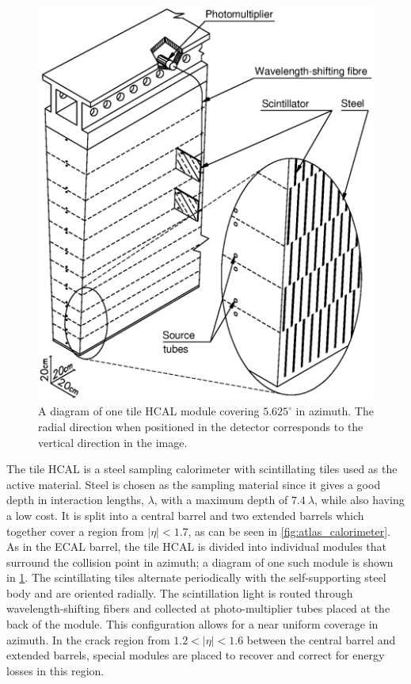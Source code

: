 \begin{figure}[ht]
\centering
\includegraphics[width=.6\textwidth]{figures/atlas/hcal_module.eps}
\caption{ A diagram of one tile HCAL module 
covering $5.625^{\circ}$ in azimuth. The radial direction when 
positioned in the detector corresponds to the vertical direction in the
image.}
\label{fig:atlas_hcal_module}
\end{figure}


The tile HCAL is a steel sampling calorimeter with scintillating tiles used as the 
active material.
Steel is chosen as the sampling material since it gives a good
depth in interaction lengths, $\lambda$, with a maximum depth
of $7.4~\lambda$, while also having a low cost.
It is split into a central barrel and two extended barrels 
which together cover a 
region from $|\eta|< 1.7$, as can be seen in \fig\ref{fig:atlas_calorimeter}.
As in the ECAL barrel, the tile HCAL is divided into individual modules
that surround the collision point in azimuth; a diagram of one such
module is shown in \fig\ref{fig:atlas_hcal_module}.
The scintillating tiles alternate periodically with the self-supporting
steel body and are oriented radially. 
The scintillation
light is routed through wavelength-shifting fibers and collected
at photo-multiplier tubes placed at the back of the module.
This configuration allows for a near uniform coverage in azimuth.  
In the crack region from $1.2 < |\eta| < 1.6$ between the central barrel 
and extended barrels, special modules are placed to recover and correct
for energy losses in this region.

